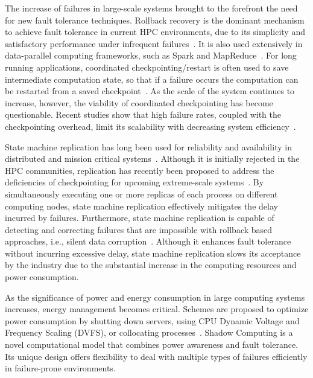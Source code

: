 The increase of failures in large-scale systems
brought to the forefront the need for new fault tolerance techniques. 
Rollback recovery is the dominant mechanism to achieve
fault tolerance in current HPC environments, due to its simplicity and satisfactory performance under infrequent failures~\cite{elnozahy2002survey}. It is also used extensively in data-parallel computing frameworks, such as Spark and MapReduce~\cite{Dean2004,Zaharia180560}. For long running applications, coordinated checkpointing/restart is often used to save intermediate computation state, so that if a failure occurs the computation can be restarted from a saved checkpoint~\cite{agarwal2004adaptive,elnozahy2004checkpointing,zheng2004ftc,moody2010design}. As the scale of the system continues to increase, however, the viability of coordinated checkpointing has become questionable. Recent studies show that high failure rates, coupled with the checkpointing overhead, limit its scalability with decreasing system efficiency~\cite{cappello2009fault,ferreira2011evaluating,fiala2012detection}. 

State machine replication has long
been used for reliability and availability in distributed and
mission critical systems~\cite{schneider1990implementing}. Although it is initially rejected in the HPC communities, replication has recently been
proposed to address the deficiencies of checkpointing for upcoming extreme-scale systems~\cite{ferreira2011evaluating,engelmann2011redundant,elliott2012combining}. 
By simultaneously executing one or more replicas of each process on different computing nodes, state machine replication effectively mitigates the delay incurred by failures. Furthermore, state machine replication is capable of detecting and correcting failures that are impossible with rollback based approaches, i.e., silent data corruption~\cite{fiala2012detection}. Although it enhances fault tolerance without
incurring excessive delay, state machine replication
slows its acceptance by the industry due to the substantial increase in the computing resources and power consumption. 

As the significance of power and energy consumption in large computing systems increases, energy management becomes critical. Schemes are proposed to optimize power consumption by shutting down servers, using CPU Dynamic Voltage and Frequency Scaling (DVFS), or collocating processes~\cite{sarood2014maximizing,yu2015energy,Pillai2001,7816907}. Shadow Computing is a novel computational model that combines power awareness and fault tolerance. Its unique design offers flexibility to deal with multiple types of failures efficiently in failure-prone environments.